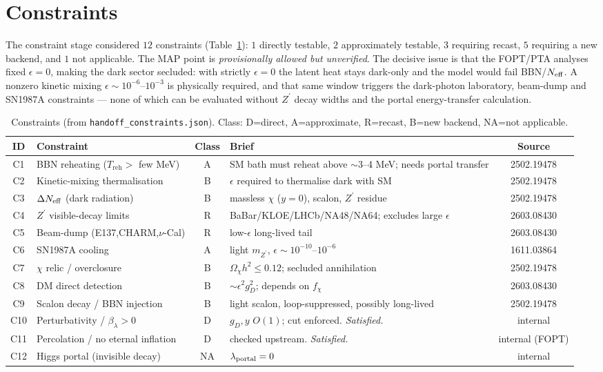 \documentclass[11pt]{article}
\newcommand{\Zp}{Z^{\prime}}
\newcommand{\gD}{g_{D}}
\newcommand{\mZp}{m_{\Zp}}
\newcommand{\Treh}{T_{\mathrm{reh}}}
\begin{document}
\section{Constraints}
\label{sec:constraints}
The constraint stage considered $12$ constraints (Table~\ref{tab:constr}): $1$ directly testable,
$2$ approximately testable, $3$ requiring recast, $5$ requiring a new backend, and $1$ not applicable.
The MAP point is \emph{provisionally allowed but unverified}. The decisive issue is that the FOPT/PTA
analyses fixed $\epsilon=0$, making the dark sector secluded: with strictly $\epsilon=0$ the latent
heat stays dark-only and the model would fail BBN/$N_{\rm eff}$. A nonzero kinetic mixing
$\epsilon\sim10^{-6}\text{--}10^{-3}$ is physically required, and that same window triggers the
dark-photon laboratory, beam-dump and SN1987A constraints --- none of which can be evaluated without
$\Zp$ decay widths and the portal energy-transfer calculation.

\begin{table}[h]
\centering
\small
\caption{Constraints (from \texttt{handoff\_constraints.json}). Class:
D=direct, A=approximate, R=recast, B=new backend, NA=not applicable.}
\label{tab:constr}
\begin{tabular}{clcp{5.6cm}c}
\toprule
ID & Constraint & Class & Brief & Source \\
\midrule
C1 & BBN reheating ($\Treh>$ few MeV) & A & SM bath must reheat above $\sim3$--4 MeV; needs portal transfer & 2502.19478 \\
C2 & Kinetic-mixing thermalisation & B & $\epsilon$ required to thermalise dark with SM & 2502.19478 \\
C3 & $\Delta N_{\rm eff}$ (dark radiation) & B & massless $\chi$ ($y{=}0$), scalon, $\Zp$ residue & 2502.19478 \\
C4 & $\Zp$ visible-decay limits & R & BaBar/KLOE/LHCb/NA48/NA64; excludes large $\epsilon$ & 2603.08430 \\
C5 & Beam-dump (E137,CHARM,$\nu$-Cal) & R & low-$\epsilon$ long-lived tail & 2603.08430 \\
C6 & SN1987A cooling & A & light $\mZp$, $\epsilon\sim10^{-10}$--$10^{-6}$ & 1611.03864 \\
C7 & $\chi$ relic / overclosure & B & $\Omega_\chi h^2\le0.12$; secluded annihilation & 2502.19478 \\
C8 & DM direct detection & B & $\sim\epsilon^2\gD^2$; depends on $f_\chi$ & 2603.08430 \\
C9 & Scalon decay / BBN injection & B & light scalon, loop-suppressed, possibly long-lived & 2502.19478 \\
C10 & Perturbativity / $\beta_\lambda>0$ & D & $\gD,y$ $O(1)$; cut enforced. \emph{Satisfied.} & internal \\
C11 & Percolation / no eternal inflation & D & checked upstream. \emph{Satisfied.} & internal (FOPT) \\
C12 & Higgs portal (invisible decay) & NA & $\lambda_{\rm portal}=0$ & internal \\
\bottomrule
\end{tabular}
\end{table}
\end{document}
